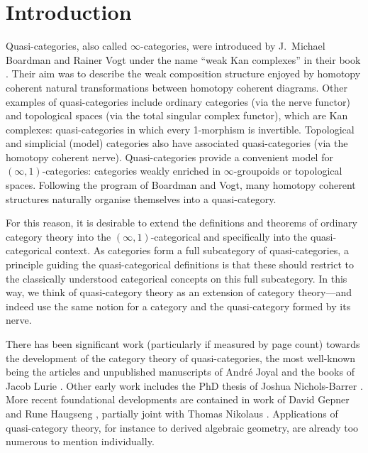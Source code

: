 

\section{Introduction}

Quasi-categories, also called $\infty$-categories, were introduced by J.~Michael Boardman and Rainer Vogt under the name ``weak Kan complexes'' in their book \cite{Boardman:1973xo}. Their aim was to describe the weak composition structure enjoyed by homotopy coherent natural transformations between homotopy coherent diagrams. Other examples of quasi-categories include ordinary categories (via the nerve functor) and topological spaces (via the total singular complex functor), which are Kan complexes: quasi-categories in which every 1-morphism is invertible. Topological and simplicial (model) categories also have associated quasi-categories (via the homotopy coherent nerve). Quasi-categories provide a convenient model for $(\infty,1)$-categories: categories weakly enriched in $\infty$-groupoids or topological spaces. Following the program of Boardman and Vogt, many homotopy coherent structures naturally organise themselves into a quasi-category.

For this reason, it is desirable to extend the definitions and theorems of ordinary category theory into the $(\infty,1)$-categorical and specifically into the quasi-categorical context. As categories form a full subcategory of quasi-categories, a principle guiding the quasi-categorical definitions is that these should restrict to the classically understood categorical concepts on this full subcategory. In this way, we think of quasi-category theory as an extension of category theory---and indeed use the same notion for a category and the quasi-category formed by its nerve.

There has been significant work (particularly if measured by page count) towards the development of the category theory of quasi-categories, the most well-known being the articles and unpublished manuscripts of Andr\'{e} Joyal \cite{Joyal:2002:QuasiCategories,Joyal:2007kk,Joyal:2008tq} and the books of Jacob Lurie \cite{Lurie:2009fk,Lurie:2012uq}. Other early work includes the PhD thesis of Joshua Nichols-Barrer \cite{NicholsBarrer:2007oq}.  More recent foundational developments are contained in work of David Gepner and Rune Haugseng \cite{GepnerHaugseng:2013ec}, partially joint with Thomas Nikolaus \cite{GepnerHaugsengNikolaus:2015lc}. Applications of quasi-category theory, for instance to derived algebraic geometry, are already too numerous to mention individually.

